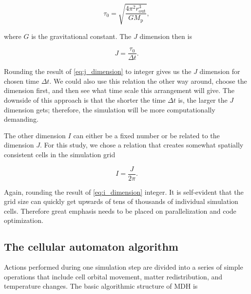 \begin{equation}
    \tau_{0} = \sqrt{\frac{4 \pi^2 r_{\text{out}}^3}{G M_{\text{p}}}},
    \label{eq:outer_layer_tau}
\end{equation}

where $G$ is the gravitational constant. The $J$ dimension then is

\begin{equation}
	J = \frac{\tau_{0}}{\Delta t}.
	\label{eq:j_dimension}
\end{equation}

Rounding the result of \eqref{eq:j_dimension} to integer gives us the $J$ dimension for chosen time $\Delta t$. We could also use this relation the other way around, choose the dimension first, and then see what time scale this arrangement will give. The downside of this approach is that the shorter the time $\Delta t$ is, the larger the $J$ dimension gets; therefore, the simulation will be more computationally demanding.

The other dimension $I$ can either be a fixed number or be related to the dimension $J$. For this study, we chose a relation that creates somewhat spatially consistent cells in the simulation grid

\begin{equation}
	I = \frac{J}{2 \pi}.
	\label{eq:i_dimension} 
\end{equation}

Again, rounding the result of \eqref{eq:i_dimension} integer. It is self-evident that the grid size can quickly get upwards of tens of thousands of individual simulation cells. Therefore great emphasis needs to be placed on parallelization and code optimization. 

\subsection{The cellular automaton algorithm}

Actions performed during one simulation step are divided into a series of simple operations that include cell orbital movement, matter redistribution, and temperature changes. The basic algorithmic structure of MDH is

